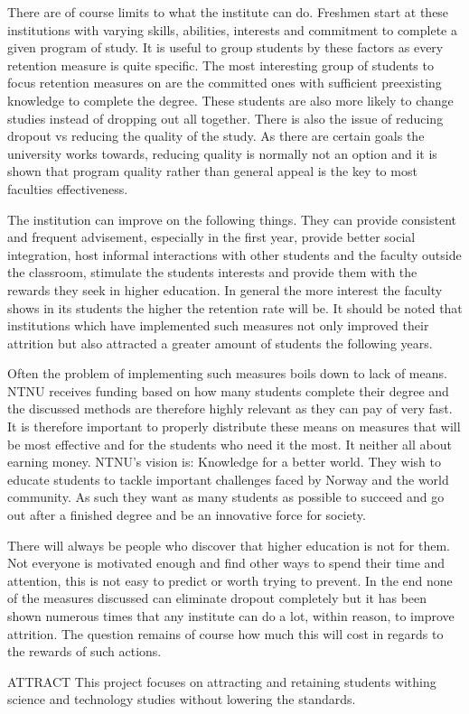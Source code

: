 \bigskip\noindent
There are of course limits to what the institute can do.
Freshmen start at these institutions with varying skills, abilities, interests and commitment to complete a given program of study.
It is useful to group students by these factors as every retention measure is quite specific.
The most interesting group of students to focus retention measures on are the committed ones with sufficient preexisting knowledge to complete the degree.
These students are also more likely to change studies instead of dropping out all together.
There is also the issue of reducing dropout vs reducing the quality of the study.
As there are certain goals the university works towards, reducing quality is normally not an option and it is shown that program quality rather than general appeal is the key to most faculties effectiveness.

\bigskip\noindent
The institution can improve on the following things.
They can provide consistent and frequent advisement, especially in the first year,
provide better social integration,
host informal interactions with other students and the faculty outside the classroom,
stimulate the students interests and provide them with the rewards they seek in higher education.
In general the more interest the faculty shows in its students the higher the retention rate will be.
It should be noted that institutions which have implemented such measures not only improved their attrition but also attracted a greater amount of students the following years.

\bigskip\noindent
Often the problem of implementing such measures boils down to lack of means.
NTNU receives funding based on how many students complete their degree and the discussed methods are therefore highly relevant as they can pay of very fast.
It is therefore important to properly distribute these means on measures that will be most effective and for the students who need it the most.
It neither all about earning money.
NTNU's vision is: Knowledge for a better world.
They wish to educate students to tackle important challenges faced by Norway and the world community.
As such they want as many students as possible to succeed and go out after a finished degree and be an innovative force for society. 

\bigskip\noindent
There will always be people who discover that higher education is not for them.
Not everyone is motivated enough and find other ways to spend their time and attention, this is not easy to predict or worth trying to prevent.
In the end none of the measures discussed can eliminate dropout completely but it has been shown numerous times that any institute can do a lot, within reason, to improve attrition. 
The question remains of course how much this will cost in regards to the rewards of such actions.

\bigskip\noindent
ATTRACT
This project focuses on attracting and retaining students withing science and technology studies without lowering the standards. 

